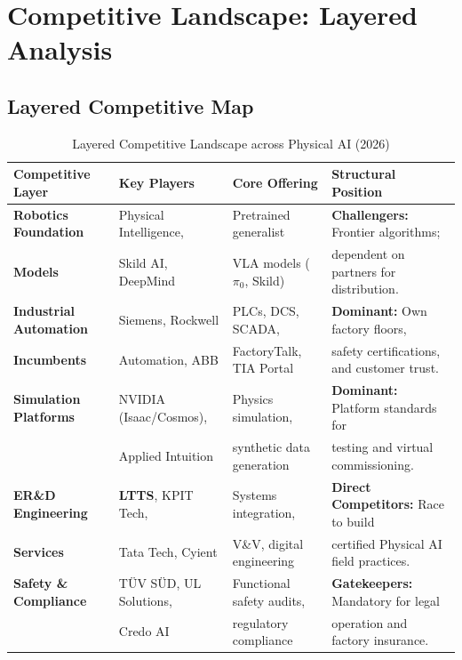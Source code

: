 \documentclass[11pt,a4paper]{article}
\begin{document}
\section{Competitive Landscape: Layered Analysis}

\subsection{Layered Competitive Map}
\begin{table}[h!]
\centering
\small
\begin{tabularx}{\textwidth}{@{}l p{3.8cm} p{3.2cm} X@{}}
\toprule
\textbf{Competitive Layer} & \textbf{Key Players} & \textbf{Core Offering} & \textbf{Structural Position} \\
\midrule
\textbf{Robotics Foundation} & Physical Intelligence, & Pretrained generalist & \textbf{Challengers:} Frontier algorithms; \\
\textbf{Models} & Skild AI, DeepMind & VLA models ($\pi_0$, Skild) & dependent on partners for distribution. \\
\addlinespace
\textbf{Industrial Automation} & Siemens, Rockwell & PLCs, DCS, SCADA, & \textbf{Dominant:} Own factory floors, \\
\textbf{Incumbents} & Automation, ABB & FactoryTalk, TIA Portal & safety certifications, and customer trust. \\
\addlinespace
\textbf{Simulation Platforms} & NVIDIA (Isaac/Cosmos), & Physics simulation, & \textbf{Dominant:} Platform standards for \\
& Applied Intuition & synthetic data generation & testing and virtual commissioning. \\
\addlinespace
\textbf{ER\&D Engineering} & \textbf{LTTS}, KPIT Tech, & Systems integration, & \textbf{Direct Competitors:} Race to build \\
\textbf{Services} & Tata Tech, Cyient & V\&V, digital engineering & certified Physical AI field practices. \\
\addlinespace
\textbf{Safety \& Compliance} & TÜV SÜD, UL Solutions, & Functional safety audits, & \textbf{Gatekeepers:} Mandatory for legal \\
& Credo AI & regulatory compliance & operation and factory insurance. \\
\bottomrule
\end{tabularx}
\caption{Layered Competitive Landscape across Physical AI (2026)}
\end{table}
\end{document}
